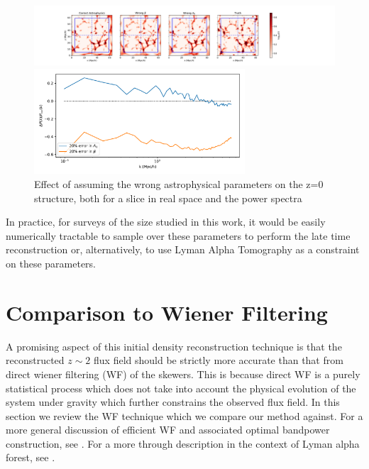\documentclass[times]{aastex62}
\begin{document}
\begin{figure}
\centering 
  
  \includegraphics[trim=3cm 0cm 0cm 0cm,width=1.2\textwidth]{./appendix_figures/z=0_wrongdensity.pdf}
  
  
  \includegraphics[trim=0cm 0cm 0cm 0cm,width=0.70\textwidth]{./appendix_figures/wrong_astro_ps.pdf}
    \caption{Effect of assuming the wrong astrophysical parameters on the z=0 structure, both for a slice in real space and the power spectra} 
    \label{fig_sims2x2}
\end{figure}

In practice, for surveys of the size studied in this work, it would be easily numerically tractable to sample over these parameters to perform the late time reconstruction or, alternatively, to use Lyman Alpha Tomography as a constraint on these parameters.



\section{Comparison to Wiener Filtering}
\label{app:wf}

A promising aspect of this initial density reconstruction technique is that the reconstructed $z\sim 2$ flux field should be strictly more accurate than that from direct wiener filtering (WF) of the skewers. This is because direct WF is a purely statistical process which does not take into account the physical evolution of the system under gravity which further constrains the observed flux field. In this section we review the WF technique which we compare our method against. For a more general discussion of efficient WF and associated optimal bandpower construction, see \cite{seljak1998cosmography,2018Horowitz}. For a more through description in the context of Lyman alpha forest, see \cite{Stark2015}.
\end{document}
